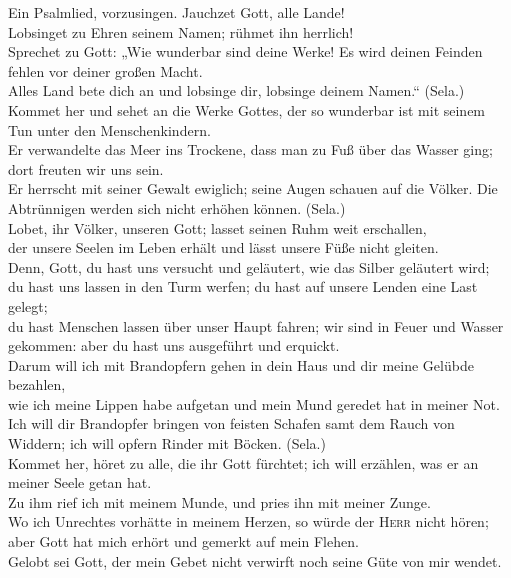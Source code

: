  Ein Psalmlied, vorzusingen. Jauchzet Gott, alle Lande!\\
 Lobsinget zu Ehren seinem Namen; rühmet ihn herrlich!\\
 Sprechet zu Gott: „Wie wunderbar sind deine Werke! Es
wird deinen Feinden fehlen vor deiner großen Macht.\\
 Alles Land bete dich an und lobsinge dir, lobsinge deinem
Namen.`` (Sela.)\\
 Kommet her und sehet an die Werke Gottes, der so
wunderbar ist mit seinem Tun unter den Menschenkindern.\\
 Er verwandelte das Meer ins Trockene, dass man zu Fuß
über das Wasser ging; dort freuten wir uns sein.\\
 Er herrscht mit seiner Gewalt ewiglich; seine Augen
schauen auf die Völker. Die Abtrünnigen werden sich nicht erhöhen
können. (Sela.)\\
 Lobet, ihr Völker, unseren Gott; lasset seinen Ruhm weit
erschallen,\\
 der unsere Seelen im Leben erhält und lässt unsere Füße
nicht gleiten.\\
 Denn, Gott, du hast uns versucht und geläutert, wie das
Silber geläutert wird;\\
 du hast uns lassen in den Turm werfen; du hast auf
unsere Lenden eine Last gelegt;\\
 du hast Menschen lassen über unser Haupt fahren; wir
sind in Feuer und Wasser gekommen: aber du hast uns ausgeführt und
erquickt.\\
 Darum will ich mit Brandopfern gehen in dein Haus und
dir meine Gelübde bezahlen,\\
 wie ich meine Lippen habe aufgetan und mein Mund geredet
hat in meiner Not.\\
 Ich will dir Brandopfer bringen von feisten Schafen samt
dem Rauch von Widdern; ich will opfern Rinder mit Böcken. (Sela.)\\
 Kommet her, höret zu alle, die ihr Gott fürchtet; ich
will erzählen, was er an meiner Seele getan hat.\\
 Zu ihm rief ich mit meinem Munde, und pries ihn mit
meiner Zunge.\\
 Wo ich Unrechtes vorhätte in meinem Herzen, so würde der
\textsc{Herr} nicht hören;\\
 aber Gott hat mich erhört und gemerkt auf mein Flehen.\\
 Gelobt sei Gott, der mein Gebet nicht verwirft noch
seine Güte von mir wendet.

